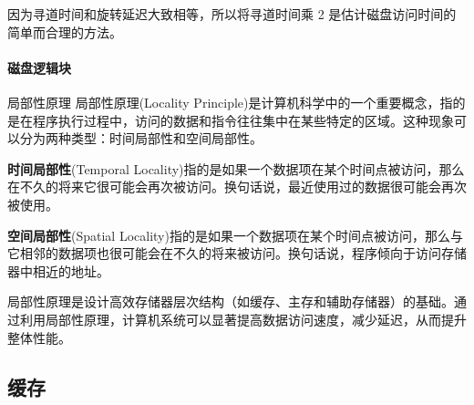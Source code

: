 因为寻道时间和旋转延迟大致相等，所以将寻道时间乘 2 是估计磁盘访问时间的简单而合理的方法。

\paragraph{磁盘逻辑块}

\begin{sidenote}{局部性原理}
    局部性原理(Locality Principle)是计算机科学中的一个重要概念，指的是在程序执行过程中，访问的数据和指令往往集中在某些特定的区域。这种现象可以分为两种类型：时间局部性和空间局部性。
    
    \textbf{时间局部性}(Temporal Locality)指的是如果一个数据项在某个时间点被访问，那么在不久的将来它很可能会再次被访问。换句话说，最近使用过的数据很可能会再次被使用。
    
    \textbf{空间局部性}(Spatial Locality)指的是如果一个数据项在某个时间点被访问，那么与它相邻的数据项也很可能会在不久的将来被访问。换句话说，程序倾向于访问存储器中相近的地址。
    
    局部性原理是设计高效存储器层次结构（如缓存、主存和辅助存储器）的基础。通过利用局部性原理，计算机系统可以显著提高数据访问速度，减少延迟，从而提升整体性能。

\end{sidenote}


\subsection{缓存}
